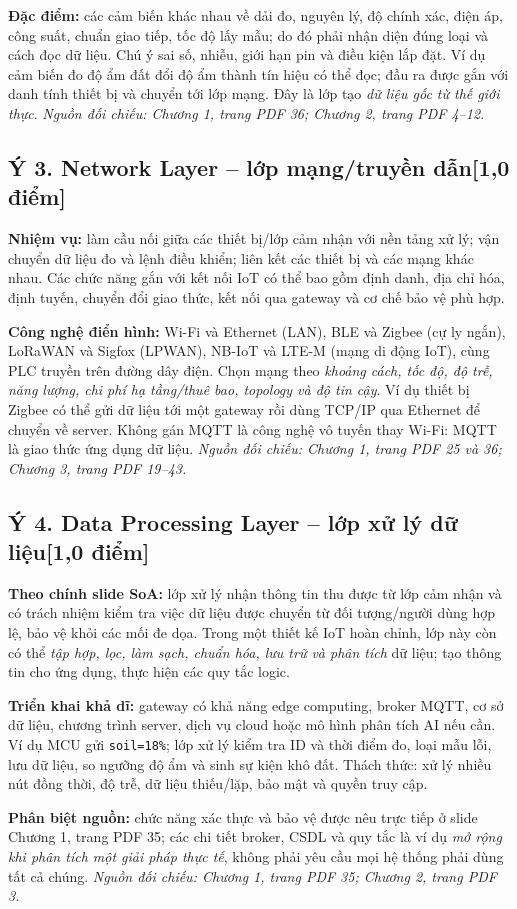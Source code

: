 \documentclass[12pt,a4paper]{article}
\newcommand{\muc}[1]{\subsection*{#1\hfill{\color{teal}\normalsize [1,0 điểm]}}}
\newcommand{\nguon}[1]{{\small\itshape\color{navy}Nguồn đối chiếu: #1.}}
\begin{document}
\textbf{Đặc điểm:} các cảm biến khác nhau về dải đo, nguyên lý, độ chính xác, điện áp, công suất, chuẩn giao tiếp, tốc độ lấy mẫu; do đó phải nhận diện đúng loại và cách đọc dữ liệu. Chú ý sai số, nhiễu, giới hạn pin và điều kiện lắp đặt. Ví dụ cảm biến đo độ ẩm đất đổi độ ẩm thành tín hiệu có thể đọc; đầu ra được gắn với danh tính thiết bị và chuyển tới lớp mạng. Đây là lớp tạo \emph{dữ liệu gốc từ thế giới thực}. \nguon{Chương 1, trang PDF 36; Chương 2, trang PDF 4--12}

\muc{Ý 3. Network Layer -- lớp mạng/truyền dẫn}
\textbf{Nhiệm vụ:} làm cầu nối giữa các thiết bị/lớp cảm nhận với nền tảng xử lý; vận chuyển dữ liệu đo và lệnh điều khiển; liên kết các thiết bị và các mạng khác nhau. Các chức năng gắn với kết nối IoT có thể bao gồm định danh, địa chỉ hóa, định tuyến, chuyển đổi giao thức, kết nối qua gateway và cơ chế bảo vệ phù hợp.

\textbf{Công nghệ điển hình:} Wi-Fi và Ethernet (LAN), BLE và Zigbee (cự ly ngắn), LoRaWAN và Sigfox (LPWAN), NB-IoT và LTE-M (mạng di động IoT), cùng PLC truyền trên đường dây điện. Chọn mạng theo \emph{khoảng cách, tốc độ, độ trễ, năng lượng, chi phí hạ tầng/thuê bao, topology và độ tin cậy}. Ví dụ thiết bị Zigbee có thể gửi dữ liệu tới một gateway rồi dùng TCP/IP qua Ethernet để chuyển về server. Không gán MQTT là công nghệ vô tuyến thay Wi-Fi: MQTT là giao thức ứng dụng dữ liệu. \nguon{Chương 1, trang PDF 25 và 36; Chương 3, trang PDF 19--43}

\muc{Ý 4. Data Processing Layer -- lớp xử lý dữ liệu}
\textbf{Theo chính slide SoA:} lớp xử lý nhận thông tin thu được từ lớp cảm nhận và có trách nhiệm kiểm tra việc dữ liệu được chuyển từ đối tượng/người dùng hợp lệ, bảo vệ khỏi các mối đe dọa. Trong một thiết kế IoT hoàn chỉnh, lớp này còn có thể \emph{tập hợp, lọc, làm sạch, chuẩn hóa, lưu trữ và phân tích} dữ liệu; tạo thông tin cho ứng dụng, thực hiện các quy tắc logic.

\textbf{Triển khai khả dĩ:} gateway có khả năng edge computing, broker MQTT, cơ sở dữ liệu, chương trình server, dịch vụ cloud hoặc mô hình phân tích AI nếu cần. Ví dụ MCU gửi \texttt{soil=18\%}; lớp xử lý kiểm tra ID và thời điểm đo, loại mẫu lỗi, lưu dữ liệu, so ngưỡng độ ẩm và sinh sự kiện khô đất. Thách thức: xử lý nhiều nút đồng thời, độ trễ, dữ liệu thiếu/lặp, bảo mật và quyền truy cập.

\textbf{Phân biệt nguồn:} chức năng xác thực và bảo vệ được nêu trực tiếp ở slide Chương 1, trang PDF 35; các chi tiết broker, CSDL và quy tắc là ví dụ \emph{mở rộng khi phân tích một giải pháp thực tế}, không phải yêu cầu mọi hệ thống phải dùng tất cả chúng. \nguon{Chương 1, trang PDF 35; Chương 2, trang PDF 3}
\end{document}
